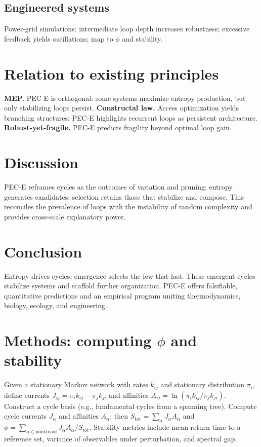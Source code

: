 \documentclass[11pt,a4paper]{article}
\newcommand{\dotS}{\dot S_{\mathrm{tot}}}
\newcommand{\phifrac}{\phi}
\begin{document}
\subsection{Engineered systems}
Power-grid simulations: intermediate loop depth increases robustness; excessive feedback yields oscillations; map to $\phifrac$ and stability.

\section{Relation to existing principles}
\textbf{MEP.} PEC-E is orthogonal: some systems maximize entropy production, but only stabilizing loops persist. \textbf{Constructal law.} Access optimization yields branching structures; PEC-E highlights recurrent loops as persistent architecture. \textbf{Robust-yet-fragile.} PEC-E predicts fragility beyond optimal loop gain.

\section{Discussion}
PEC-E reframes cycles as the outcomes of variation and pruning: entropy generates candidates; selection retains those that stabilize and compose. This reconciles the prevalence of loops with the instability of random complexity and provides cross-scale explanatory power.

\section{Conclusion}
Entropy drives cycles; emergence selects the few that last. These emergent cycles stabilize systems and scaffold further organization. PEC-E offers falsifiable, quantitative predictions and an empirical program uniting thermodynamics, biology, ecology, and engineering.

\section*{Methods: computing \texorpdfstring{$\phifrac$}{phi} and stability}
Given a stationary Markov network with rates $k_{ij}$ and stationary distribution $\pi_i$, define currents $J_{ij}=\pi_i k_{ij}-\pi_j k_{ji}$ and affinities $A_{ij}=\ln(\pi_i k_{ij}/\pi_j k_{ji})$. Construct a cycle basis (e.g., fundamental cycles from a spanning tree). Compute cycle currents $J_\alpha$ and affinities $A_\alpha$; then $\dotS=\sum_\alpha J_\alpha A_\alpha$ and $\phifrac=\sum_{\alpha\in \text{nontrivial}} J_\alpha A_\alpha/\dotS$. Stability metrics include mean return time to a reference set, variance of observables under perturbation, and spectral gap.
\end{document}
